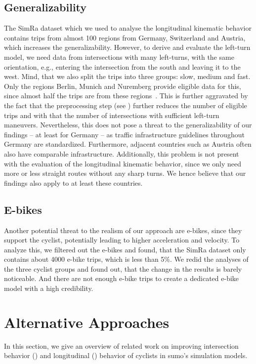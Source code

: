 \subsection{Generalizability}%
\label{subsec:problem_general}
The SimRa dataset which we used to analyse the longitudinal kinematic behavior contains trips from almost \num{100} regions from Germany, Switzerland and Austria, which increases the generalizability.
However, to derive and evaluate the left-turn model, we need data from intersections with many left-turns, with the same orientation, e.g., entering the intersection from the south and leaving it to the west.
Mind, that we also split the trips into three groups: slow, medium and fast.
Only the regions Berlin, Munich and Nuremberg provide eligible data for this, since almost half the trips are from these regions~\cite{karakaya2022cyclesense}.
This is further aggravated by the fact that the preprocessing step (see ) further reduces the number of eligible trips and with that the number of intersections with sufficient left-turn maneuvers.
Nevertheless, this does not pose a threat to the generalizability of our findings -- at least for Germany -- as traffic infrastructure guidelines throughout Germany are standardized.
Furthermore, adjacent countries such as Austria often also have comparable infrastructure.
Additionally, this problem is not present with the evaluation of the longitudinal kinematic behavior, since we only need more or less straight routes without any sharp turns.
We hence believe that our findings also apply to at least these countries.

\subsection{E-bikes}
\label{subsec:e-bikes}
Another potential threat to the realism of our approach are e-bikes, since they support the cyclist, potentially leading to higher acceleration and velocity.
To analyze this, we filtered out the e-bikes and found, that the SimRa dataset only contains about \num{4000} e-bike trips, which is less than \num{5}\%.
We redid the analyses of the three cyclist groups and found out, that the change in the results is barely noticeable.
And there are not enough e-bike trips to create a dedicated e-bike model with a high credibility.


\section{Alternative Approaches}
\label{sec:related_work_sumo}
In this section, we give an overview of related work on improving intersection behavior () and longitudinal () behavior of cyclists in \ac{sumo}'s simulation models.

